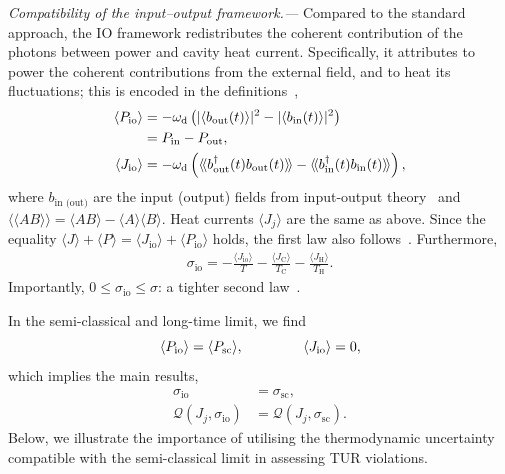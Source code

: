 \documentclass[aps,twocolumn,10pt,prl,floatfix,nofootinbib, superscriptaddress]{revtex4-2}
\newcommand{\bin}{b_\text{in}}
\newcommand{\dbin}{b_\text{in}^\dagger}
\newcommand{\bout}{b_\text{out}}
\newcommand{\dbout}{b_\text{out}^\dagger}
\begin{document}
\textit{Compatibility of the input--output framework.—}
Compared to the standard approach, the IO framework redistributes the coherent contribution of the photons between power and cavity heat current. Specifically, it attributes to power the coherent contributions from the external field, and to heat its fluctuations; this is encoded in the definitions~\cite{PhysRevLett.124.130601, schrauwen2025},
\begin{align}
     \langle P_{\rm io} \rangle &=- \omega_{\rm d}\left(|\langle\bout(t)\rangle|^2 -|\langle\bin(t)\rangle|^2\right) \label{eq:Pio}\\
        & = P_\text{in} - P_\text{out}, \nonumber\\
        \langle J_{\rm io} \rangle &= -\omega_{\rm d}\left(\langle\!\langle\dbout(t)\bout(t)\rangle\!\rangle -\langle\!\langle\dbin(t)\bin(t)\rangle\!\rangle\right) \label{eq:Jio},
\end{align}
where $b_\text{in (out)}$ are the input (output) fields from input-output theory~\cite{gardiner_1985} and $\langle\!\langle AB\rangle\!\rangle = \langle AB\rangle-\langle A\rangle\langle B\rangle$. Heat currents  $\langle J_j\rangle$ are the same as above.
Since  the equality $\langle J \rangle + \langle P \rangle = \langle J_\text{io} \rangle + \langle P_\text{io} \rangle$
holds, the first law also follows~\cite{schrauwen2025}. Furthermore,
 \begin{align}
    \sigma_\text{io} = -\frac{\langle J_\text{io}\rangle}{T} - \frac{\langle J_\text{C}\rangle}{T_\text{C}} - \frac{\langle J_\text{H}\rangle}{T_\text{H}}.
 \end{align}
Importantly, $0\leq \sigma_\text{io}\leq \sigma$: a tighter second law~\cite{schrauwen2025}.


In the semi-classical and long-time limit, we find~\cite{supmat}
\begin{equation}
    \langle P_\text{io}\rangle = \langle P_\text{sc}\rangle\label{eq:Pio-scaling-maser},\hspace{1.5cm}
    \langle J_\text{io}\rangle = 0,
\end{equation}
which implies the main results,
\begin{align}
    \sigma_\text{io} &= \sigma_\text{sc}, \label{eq:Sigma-scaling-maser}\\
    \mathcal{Q}(J_j, \sigma_\text{io}) &= \mathcal{Q}(J_j, \sigma_\text{sc}).
\end{align}
Below, we illustrate the importance of utilising the thermodynamic uncertainty compatible with the semi-classical limit in assessing TUR violations.
\end{document}
